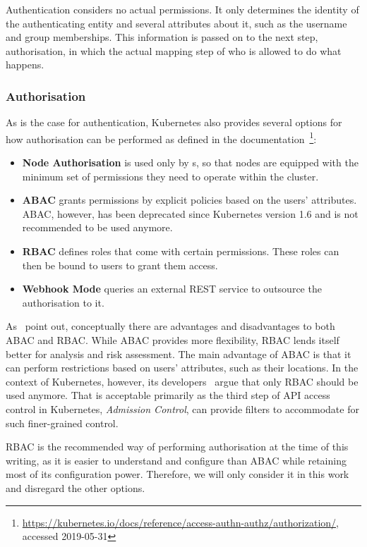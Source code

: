Authentication considers no actual permissions. It only determines the identity of the authenticating entity and several attributes about it, such as the username and group memberships. This information is passed on to the next step, authorisation, in which the actual mapping step of who is allowed to do what happens. 

\subsubsection{Authorisation} \label{ssec:authorisation}

As is the case for authentication, Kubernetes also provides several options for how authorisation can be performed as defined in the documentation~\textcite{k8sdocs}\footnote{\url{https://kubernetes.io/docs/reference/access-authn-authz/authorization/}, accessed 2019-05-31}:

\begin{itemize}
    \item \textbf{Node Authorisation} is used only by s, so that nodes are equipped with the minimum set of permissions they need to operate within the cluster.
    \item \textbf{\ac{ABAC}} grants permissions by explicit policies based on the users' attributes. \ac{ABAC}, however, has been deprecated since Kubernetes version 1.6 and is not recommended to be used anymore.
    \item \textbf{\ac{RBAC}} defines roles that come with certain permissions. These roles can then be bound to users to grant them access.
    \item \textbf{Webhook Mode} queries an external REST service to outsource the authorisation to it.
\end{itemize}

As~\textcite{ABACvsRBAC} point out, conceptually there are advantages and disadvantages to both \ac{ABAC} and \ac{RBAC}. While \ac{ABAC} provides more flexibility, \ac{RBAC} lends itself better for analysis and risk assessment. The main advantage of \ac{ABAC} is that it can perform restrictions based on users' attributes, such as their locations. In the context of Kubernetes, however, its developers~\textcite{ABACvsRBACk8s} argue that only \ac{RBAC} should be used anymore. That is acceptable primarily as the third step of API access control in Kubernetes, \textit{Admission Control}, can provide filters to accommodate for such finer-grained control.

\ac{RBAC} is the recommended way of performing authorisation at the time of this writing, as it is easier to understand and configure than \ac{ABAC} while retaining most of its configuration power. Therefore, we will only consider it in this work and disregard the other options.

